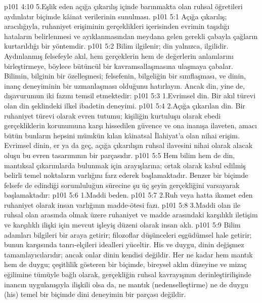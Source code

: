 \vs p101 4:10 5.\bibnobreakspace Eşlik eden açığa çıkarılış içinde barınmakta olan ruhsal öğretileri aydınlatır biçimde kâinat verilerinin sunulması.
\vs p101 5:1 Açığa çıkarılış; aracılığıyla, ruhaniyet erişiminin gerçeklikleri içerisinden evrimin taşıdığı hataların belirlenmesi ve ayıklanmasından meydana gelen gerekli çabayla çağların kurtarıldığı bir yöntemdir.
\vs p101 5:2 Bilim  ilgilenir; din yalnızca,  ilgilidir. Aydınlanmış felsefeyle akıl, hem gerçeklerin hem de değerlerin anlamlarını birleştirmeye, böylece bütüncül  bir kavramsallaşmasına ulaşmaya çabalar. Bilimin, bilginin bir özelleşmesi; felsefenin, bilgeliğin bir sınıflaşması, ve dinin, inanç deneyiminin bir uzmanlaşması olduğunu hatırlayın. Ancak din, yine de, dışavurumun iki fazını temsil etmektedir:
\vs p101 5:3 1.\bibnobreakspace Evrimsel din. Bir akıl türevi olan din şeklindeki ilkel ibadetin deneyimi.
\vs p101 5:4 2.\bibnobreakspace Açığa çıkarılan din. Bir ruhaniyet türevi olarak evren tutumu; kişiliğin kurtuluşu olarak ebedi gerçekliklerin korunumuna karşı hissedilen güvence ve ona inanışa ilaveten, amacı bütün bunların hepsini mümkün kılan kâinatsal İlahiyat’a olan nihai erişim. Evrimsel dinin, er ya da geç, açığa çıkarılışın ruhsal ilavesini nihai olarak alacak oluşu bu evren tasarımının bir parçasıdır.
\vs p101 5:5 Hem bilim hem de din, mantıksal çıkarımlarda bulunmak için arayışlarına; ortak olarak kabul edilmiş belirli temel noktaların varlığını farz ederek başlamaktadır. Benzer bir biçimde felsefe de edindiği sorumluluğun sürecine şu üç şeyin gerçekliğini varsayarak başlamaktadır:
\vs p101 5:6 1.\bibnobreakspace Maddi beden.
\vs p101 5:7 2.\bibnobreakspace Ruh veya hatta ikamet eden ruhaniyet olarak insan varlığının madde\hyp{}ötesi fazı.
\vs p101 5:8 3.\bibnobreakspace Maddi olan ile ruhsal olan arasında olmak üzere ruhaniyet ve madde arasındaki karşılıklı iletişim ve karşılıklı ilişki için mevcut işleyiş düzeni olarak insan aklı.
\vs p101 5:9 Bilim adamları bilgileri bir araya getirir; filozoflar düşünceleri eşgüdümsel hale getirir; bunun karşısında tanrı\hyp{}elçileri idealleri yüceltir. His ve duygu, dinin değişmez tamamlayıcılarıdır; ancak onlar dinin kendisi değildir. Her ne kadar hem mantık hem de duygu; çeşitlilik gösteren bir biçimde, bireysel aklın düzeyine ve mizaç eğilimine tümüyle bağlı olarak, gerçekliğin ruhsal kavrayışının derinleştirilişinde inancın uygulanışıyla ilişkili olsa da, ne mantık (nedenselleştirme) ne de duygu (his) temel bir biçimde dini deneyimin bir parçası değildir.
